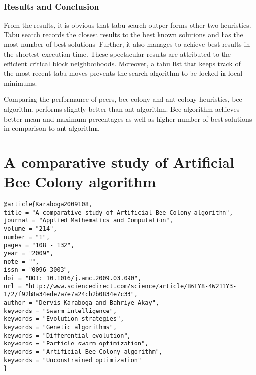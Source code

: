 \documentclass[pdftex,11pt]{article}
\begin{document}
\subsubsection{Results and Conclusion}
From the results, it is obvious that tabu search outper forms other two heuristics. Tabu search records the closest results to the best known solutions and has the most number of best solutions. Further, it also manages to achieve best results in the shortest execution time. These spectacular results are attributed to the efficient critical block neighborhoods. Moreover, a tabu list that keeps track of the most recent tabu moves prevents the search algorithm to be locked in local minimums.

Comparing the performance of peers, bee colony and ant colony heuristics, bee algorithm performs slightly better than ant algorithm. Bee algorithm achieves better mean and maximum percentages as well as higher number of best solutions in comparison to ant algorithm.
\section{A comparative study of Artificial Bee Colony algorithm}
\begin{verbatim}
@article{Karaboga2009108,
title = "A comparative study of Artificial Bee Colony algorithm",
journal = "Applied Mathematics and Computation",
volume = "214",
number = "1",
pages = "108 - 132",
year = "2009",
note = "",
issn = "0096-3003",
doi = "DOI: 10.1016/j.amc.2009.03.090",
url = "http://www.sciencedirect.com/science/article/B6TY8-4W211Y3-1/2/f92b8a34ede7a7e7a24cb2b0834e7c33",
author = "Dervis Karaboga and Bahriye Akay",
keywords = "Swarm intelligence",
keywords = "Evolution strategies",
keywords = "Genetic algorithms",
keywords = "Differential evolution",
keywords = "Particle swarm optimization",
keywords = "Artificial Bee Colony algorithm",
keywords = "Unconstrained optimization"
}
\end{verbatim}
\end{document}
